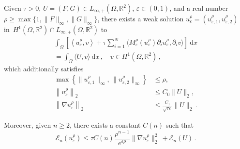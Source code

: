 \documentclass[AHL,Unicode,longabstracts,published]{cedram}
\newcommand{\bbR}{\mathbb{R}}
\newcommand{\clE}{\mathcal{E}}
\newcommand{\rmd}{\mathrm{d}}
\newcommand{\clE}{\mathcal{E}}
\begin{document}
\begin{lemm}\label{lem.ex2}
Given $\tau>0$, $U=(F,G)\in L_{\infty,+}(\Omega,\bbR^2)$, $\varepsilon\in (0,1)$, and a real number~${\rho\geq \max\{1,\|F\|_\infty,\|G\|_\infty\}}$, there exists a weak solution $u_{\varepsilon}^\rho=(u_{\varepsilon,1}^\rho, u_{\varepsilon,2}^\rho)$ in~${H^1(\Omega,\bbR^2)\cap L_{\infty,+}(\Omega,\bbR^2)}$ to
\begin{multline}\label{ex12a}
\int_\Omega \left[\left\langle u_{\varepsilon}^\rho, v \right\rangle + \tau \sum_{i=1}^N\big\langle M_{\varepsilon }^\rho(u_{\varepsilon}^\rho) \partial_i u_{\varepsilon}^\rho, \partial_i v \big\rangle \right]\ \rmd x\\ = \int_\Omega \langle U, v \rangle\ \rmd x\,, \quad v\in H^1\left(\Omega,\bbR^2\right)\,, 
\end{multline}
which additionally satisfies
\begin{align}
\max\left\{\|u_{\varepsilon,1}^\rho\|_\infty,\,\|u_{\varepsilon,2}^\rho\|_\infty\right\}&\leq \rho\label{ex12a'}
,\\[1ex]
\left\|u_{\varepsilon}^\rho\right\|_2&\leq C_0\|U\|_2,\label{ex12d}
\\[1ex]
\left\|\nabla u_{\varepsilon}^\rho\right\|_2&\leq \frac{C_1}{\sqrt{\tau\varepsilon}} \|U\|_2\,.\label{ex12e}
\end{align}

Moreover, given $n\ge 2$, there exists a constant $C(n)$ such that
\begin{equation}\label{ex12c}
\clE_n(u_\varepsilon^\rho)\le \tau C(n) \frac{\rho^{n-1}}{e^{\varepsilon\rho}}\|\nabla u_\varepsilon^\rho\|_2^2\ + \clE_n(U)\,. 
\end{equation}
\end{lemm}
\end{document}

